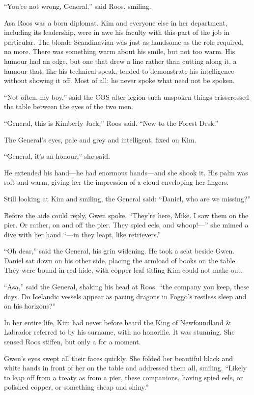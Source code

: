 \documentclass[11pt,a5paper]{article}
\begin{document}
``You're not wrong, General,'' said Roos, smiling.

Asa Roos was a born diplomat. Kim and everyone else in her department, including its leadership, were in awe his faculty with this part of the job in particular. The blonde Scandinavian was just as handsome as the role required, no more. There was something warm about his smile, but not too warm. His humour had an edge, but one that drew a line rather than cutting along it, a humour that, like his technical-speak, tended to demonstrate his intelligence without showing it off. Most of all: he never spoke what need not be spoken.

``Not often, my boy,'' said the COS after legion such unspoken things crisscrossed the table between the eyes of the two men.

``General, this is Kimberly Jack,'' Roos said. ``New to the Forest Desk.''

The General's eyes, pale and grey and intelligent, fixed on Kim.

``General, it's an honour,'' she said.

He extended his hand---he had enormous hands---and she shook it. His palm was soft and warm, giving her the impression of a cloud enveloping her fingers.

Still looking at Kim and smiling, the General said: ``Daniel, who are we missing?''

Before the aide could reply, Gwen spoke. ``They're here, Mike. I saw them on the pier. Or rather, on and off the pier. They spied eels, and whoop!---'' she mimed a dive with her hand ``---in they leapt, like retrievers.''

``Oh dear,'' said the General, his grin widening. He took a seat beside Gwen. Daniel sat down on his other side, placing the armload of books on the table. They were bound in red hide, with copper leaf titling Kim could not make out.

``Asa,'' said the General, shaking his head at Roos, ``the company you keep, these days. Do Icelandic vessels appear as pacing dragons in Foggo's restless sleep and on his horizons?''

In her entire life, Kim had never before heard the King of Newfoundland \& Labrador referred to by his surname, with no honorific. It was stunning. She sensed Roos stiffen, but only a for a moment.

Gwen's eyes swept all their faces quickly. She folded her beautiful black and white hands in front of her on the table and addressed them all, smiling. ``Likely to leap off from a treaty as from a pier, these companions, having spied eels, or polished copper, or something cheap and shiny.''
\end{document}
